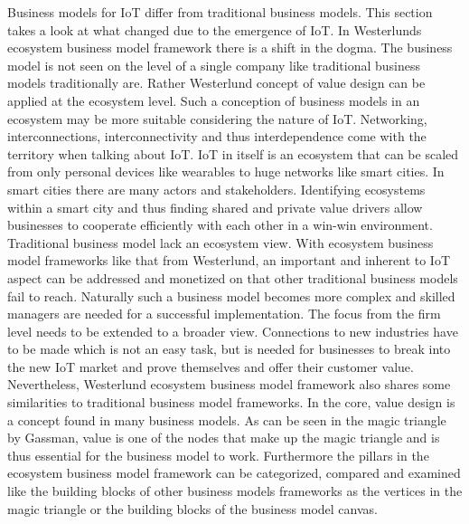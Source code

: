 	Business models for IoT differ from traditional business models. This section takes a look at what changed due to the emergence of IoT.
In Westerlunds ecosystem business model framework there is a shift in the dogma. The business model is not seen on the level of a single company like traditional business models traditionally are. Rather Westerlund concept of value design can be applied at the ecosystem level. Such a conception of business models in an ecosystem may be more suitable considering the nature of IoT. Networking, interconnections, interconnectivity and thus interdependence come with the territory when talking about IoT. IoT in itself is an ecosystem that can be scaled from only personal devices like wearables to huge networks like smart cities. In smart cities there are many actors and stakeholders. Identifying ecosystems within a smart city and thus finding shared and private value drivers allow businesses to cooperate efficiently with each other in a win-win environment. Traditional business model lack an ecosystem view. With ecosystem business model frameworks like that from Westerlund, an important and inherent to IoT aspect can be addressed and monetized on that other traditional business models fail to reach. Naturally such a business model becomes more complex and skilled managers are needed for a successful implementation. The focus from the firm level needs to be extended to a broader view. Connections to new industries have to be made which is not an easy task, but is needed for businesses to break into the new IoT market and prove themselves and offer their customer value.
Nevertheless, Westerlund ecosystem business model framework also shares some similarities to traditional business model frameworks. In the core, value design is a concept found in many business models. As can be seen in the magic triangle by Gassman, value is one of the nodes that make up the magic triangle and is thus essential for the business model to work. Furthermore the pillars in the ecosystem business model framework can be categorized, compared and examined like the building blocks of other business models frameworks as the vertices in the magic triangle or the building blocks of the business model canvas.


